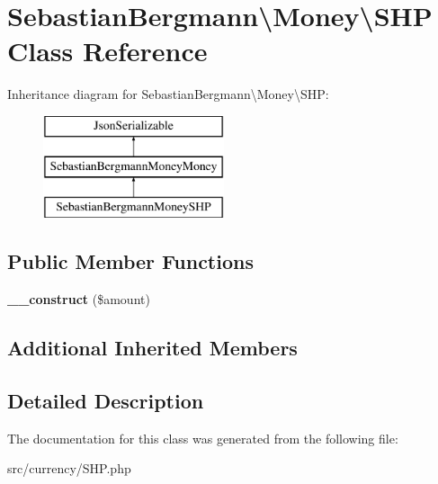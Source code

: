 \hypertarget{classSebastianBergmann_1_1Money_1_1SHP}{}\section{Sebastian\+Bergmann\textbackslash{}Money\textbackslash{}S\+H\+P Class Reference}
\label{classSebastianBergmann_1_1Money_1_1SHP}
Inheritance diagram for Sebastian\+Bergmann\textbackslash{}Money\textbackslash{}S\+H\+P\+:\begin{figure}[H]
\begin{center}
\leavevmode
\includegraphics[height=3.000000cm]{classSebastianBergmann_1_1Money_1_1SHP}
\end{center}
\end{figure}
\subsection*{Public Member Functions}
\begin{DoxyCompactItemize}
\item 
\hypertarget{classSebastianBergmann_1_1Money_1_1SHP_ae251047f645103adce80d8dd572af35d}{}{\bfseries \+\_\+\+\_\+construct} (\$amount)\label{classSebastianBergmann_1_1Money_1_1SHP_ae251047f645103adce80d8dd572af35d}

\end{DoxyCompactItemize}
\subsection*{Additional Inherited Members}


\subsection{Detailed Description}


The documentation for this class was generated from the following file\+:\begin{DoxyCompactItemize}
\item 
src/currency/S\+H\+P.\+php\end{DoxyCompactItemize}
